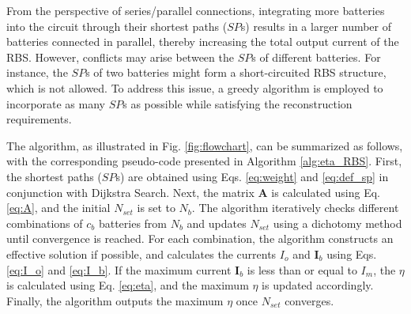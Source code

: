 \documentclass{article}
\begin{document}
From the perspective of series/parallel connections, integrating more batteries into the circuit through their shortest paths ($SP$s) results in a larger number of batteries connected in parallel, thereby increasing the total output current of the RBS.
However, conflicts may arise between the $SP$s of different batteries. 
For instance, the $SP$s of two batteries might form a short-circuited RBS structure, which is not allowed. 
To address this issue, a greedy algorithm is employed to incorporate as many $SP$s as possible while satisfying the reconstruction requirements.

The algorithm, as illustrated in Fig. \ref{fig:flowchart}, can be summarized as follows, with the corresponding pseudo-code presented in Algorithm \ref{alg:eta_RBS}.
First, the shortest paths ($SP$s) are obtained using Eqs. \ref{eq:weight} and \ref{eq:def_sp} in conjunction with Dijkstra Search. 
Next, the matrix $\bm{A}$ is calculated using Eq. \ref{eq:A}, and the initial $N_{set}$ is set to $N_b$. 
The algorithm iteratively checks different combinations of $c_b$ batteries from $N_b$ and updates $N_{set}$ using a dichotomy method until convergence is reached. 
For each combination, the algorithm constructs an effective solution if possible, and calculates the currents $I_o$ and $\bm{I}_b$ using Eqs. \ref{eq:I_o} and \ref{eq:I_b}. 
If the maximum current $\bm{I}_b$ is less than or equal to $I_m$, the $\eta$ is calculated using Eq. \ref{eq:eta}, and the maximum $\eta$ is updated accordingly. 
Finally, the algorithm outputs the maximum $\eta$ once $N_{set}$ converges.
\end{document}

